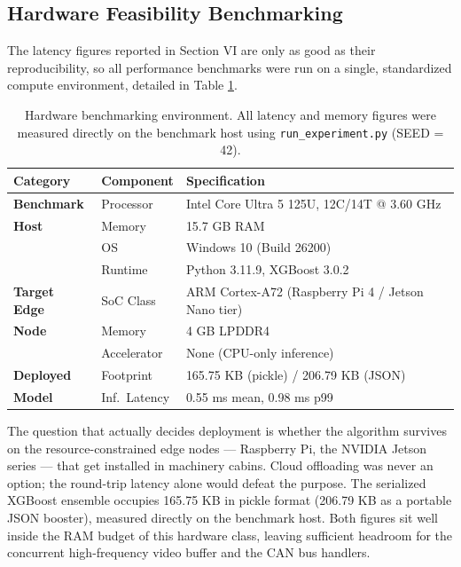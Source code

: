 \subsection{Hardware Feasibility Benchmarking}
The latency figures reported in Section VI are only as good as their
reproducibility, so all performance benchmarks were run on a single,
standardized compute environment, detailed in Table
\ref{tab:hardware_benchmarks}.

\begin{table}[htbp]
\centering
\caption{Hardware benchmarking environment. All latency and memory figures
were measured directly on the benchmark host using 
\texttt{run\_experiment.py} (SEED = 42).}
\label{tab:hardware_benchmarks}
\begin{tabular}{llp{3.4cm}}
\toprule
\textbf{Category} & \textbf{Component} & \textbf{Specification} \\
\midrule
\textbf{Benchmark} & Processor & Intel Core Ultra 5 125U, 12C/14T @ 3.60 GHz \\
\textbf{Host} & Memory & 15.7 GB RAM \\
& OS & Windows 10 (Build 26200) \\
& Runtime & Python 3.11.9, XGBoost 3.0.2 \\
\midrule
\textbf{Target Edge} & SoC Class & ARM Cortex-A72 (Raspberry Pi 4 / Jetson Nano tier) \\
\textbf{Node} & Memory & 4 GB LPDDR4 \\
& Accelerator & None (CPU-only inference) \\
\midrule
\textbf{Deployed} & Footprint & 165.75 KB (pickle) / 206.79 KB (JSON) \\
\textbf{Model} & Inf.\ Latency & 0.55 ms mean, 0.98 ms p99 \\
\bottomrule
\end{tabular}
\end{table}

The question that actually decides deployment is whether the algorithm survives
on the resource-constrained edge nodes --- Raspberry Pi, the NVIDIA Jetson
series --- that get installed in machinery cabins. Cloud offloading was never an
option; the round-trip latency alone would defeat the purpose. The serialized
XGBoost ensemble occupies 165.75 KB in pickle format (206.79 KB as a portable
JSON booster), measured directly on the benchmark host. Both figures sit well
inside the RAM budget of this hardware class, leaving sufficient headroom for
the concurrent high-frequency video buffer and the CAN bus handlers.

